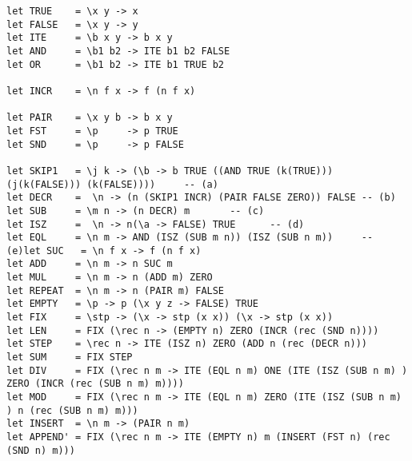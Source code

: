 \documentclass[landscape,8pt]{extarticle}
\begin{document}
\begin{multicols}{4}
\begin{center}
\begin{adjustbox}{angle=270}
\begin{lstlisting}
let TRUE    = \x y -> x
let FALSE   = \x y -> y
let ITE     = \b x y -> b x y
let AND     = \b1 b2 -> ITE b1 b2 FALSE
let OR      = \b1 b2 -> ITE b1 TRUE b2

let INCR    = \n f x -> f (n f x)

let PAIR    = \x y b -> b x y
let FST     = \p     -> p TRUE
let SND     = \p     -> p FALSE

let SKIP1   = \j k -> (\b -> b TRUE ((AND TRUE (k(TRUE))) (j(k(FALSE))) (k(FALSE))))     -- (a)
let DECR    =  \n -> (n (SKIP1 INCR) (PAIR FALSE ZERO)) FALSE -- (b)
let SUB     = \m n -> (n DECR) m       -- (c)
let ISZ     =  \n -> n(\a -> FALSE) TRUE      -- (d)
let EQL     = \n m -> AND (ISZ (SUB m n)) (ISZ (SUB n m))     -- (e)let SUC   = \n f x -> f (n f x)
let ADD     = \n m -> n SUC m
let MUL     = \n m -> n (ADD m) ZERO
let REPEAT  = \n m -> n (PAIR m) FALSE
let EMPTY   = \p -> p (\x y z -> FALSE) TRUE
let FIX     = \stp -> (\x -> stp (x x)) (\x -> stp (x x))
let LEN     = FIX (\rec n -> (EMPTY n) ZERO (INCR (rec (SND n))))
let STEP    = \rec n -> ITE (ISZ n) ZERO (ADD n (rec (DECR n)))
let SUM     = FIX STEP
let DIV     = FIX (\rec n m -> ITE (EQL n m) ONE (ITE (ISZ (SUB n m) ) ZERO (INCR (rec (SUB n m) m))))
let MOD     = FIX (\rec n m -> ITE (EQL n m) ZERO (ITE (ISZ (SUB n m) ) n (rec (SUB n m) m)))
let INSERT  = \n m -> (PAIR n m)
let APPEND' = FIX (\rec n m -> ITE (EMPTY n) m (INSERT (FST n) (rec (SND n) m)))
            \end{lstlisting}
        \end{adjustbox}
    \end{center}
\end{multicols}
\end{document}
